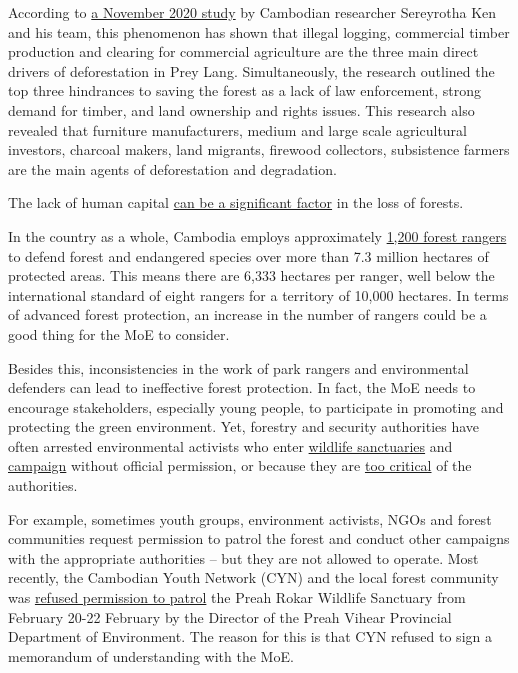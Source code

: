 \documentclass[10pt,a4paper]{letter}
\begin{document}
According to \href{https://link.springer.com/chapter/10.1007/978-3-030-62509-2_8}{a November 2020 study} by Cambodian researcher Sereyrotha Ken and his team, this phenomenon has shown that illegal logging, commercial timber production and clearing for commercial agriculture are the three main direct drivers of deforestation in Prey Lang. Simultaneously, the research outlined the top three hindrances to saving the forest as a lack of law enforcement, strong demand for timber, and land ownership and rights issues. This research also revealed that furniture manufacturers, medium and large scale agricultural investors, charcoal makers, land migrants, firewood collectors, subsistence farmers are the main agents of deforestation and degradation.

The lack of human capital \href{https://www.khmertimeskh.com/50781262/illegal-loggers-clear-30-hectares-of-forest-in-mondulkiri-province/}{can be a significant factor} in the loss of forests. 

In the country as a whole, Cambodia employs approximately \href{https://www.voacambodia.com/a/cambodia-s-rangers-risk-lives-protecting-environment/5771184.html}{1,200 forest rangers} to defend forest and endangered species over more than 7.3 million hectares of protected areas. This means there are 6,333 hectares per ranger, well below the international standard of eight rangers for a territory of 10,000 hectares. In terms of advanced forest protection, an increase in the number of rangers could be a good thing for the MoE to consider.

Besides this, inconsistencies in the work of park rangers and environmental defenders can lead to ineffective forest protection. In fact, the MoE needs to encourage stakeholders, especially young people, to participate in promoting and protecting the green environment. Yet, forestry and security authorities have often arrested environmental activists who enter \href{https://newint.org/features/2021/02/15/forest-defenders-under-fire-cambodia}{wildlife sanctuaries} and \href{https://www.rfa.org/english/news/cambodia/release-02082021175436.html}{campaign} without official permission, or because they are \href{https://www.khmertimeskh.com/50814434/supreme-court-turns-down-three-activists-bail-request/}{too critical} of the authorities.

For example, sometimes youth groups, environment activists, NGOs and forest communities request permission to patrol the forest and conduct other campaigns with the appropriate authorities -- but they are not allowed to operate. Most recently, the Cambodian Youth Network (CYN) and the local forest community was \href{https://www.facebook.com/borak.ma/posts/3268828009885906}{refused permission to patrol} the Preah Rokar Wildlife Sanctuary from February 20-22 February by the Director of the Preah Vihear Provincial Department of Environment. The reason for this is that CYN refused to sign a memorandum of understanding with the MoE.
\end{document}
